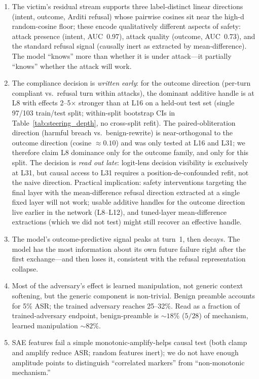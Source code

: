 \documentclass[11pt]{article}
\begin{document}
\begin{enumerate}[leftmargin=*]
  \item The victim's residual stream supports three label-distinct linear directions (intent, outcome, Arditi refusal) whose pairwise cosines sit near the high-d random-cosine floor; these encode qualitatively different aspects of safety: attack presence (intent, AUC~0.97), attack quality (outcome, AUC~0.73), and the standard refusal signal (causally inert as extracted by mean-difference). The model ``knows'' more than whether it is under attack---it partially ``knows'' whether the attack will work.
  \item The compliance decision is \emph{written early}: for the outcome direction (per-turn compliant vs.\ refusal turn within attacks), the dominant additive handle is at L8 with effects 2--5$\times$ stronger than at L16 on a held-out test set (single 97/103 train/test split; within-split bootstrap CIs in Table~\ref{tab:steering_depth}, no cross-split refit). The paired-obliteration direction (harmful breach vs.\ benign-rewrite) is near-orthogonal to the outcome direction (cosine $\approx 0.10$) and was only tested at L16 and L31; we therefore claim L8 dominance only for the outcome family, and only for this split. The decision is \emph{read out late}: logit-lens decision visibility is exclusively at L31, but causal access to L31 requires a position-de-confounded refit, not the naive direction. Practical implication: safety interventions targeting the final layer with the mean-difference refusal direction extracted at a single fixed layer will not work; usable additive handles for the outcome direction live earlier in the network (L8--L12), and tuned-layer mean-difference extractions (which we did not test) might still recover an effective handle.
  \item The model's outcome-predictive signal peaks at turn~1, then decays. The model has the most information about its own future failure right after the first exchange---and then loses it, consistent with the refusal representation collapse.
  \item Most of the adversary's effect is learned manipulation, not generic context softening, but the generic component is non-trivial. Benign preamble accounts for 5\% ASR; the trained adversary reaches 25--32\%. Read as a fraction of trained-adversary endpoint, benign-preamble is $\sim 18$\% ($5/28$) of mechanism, learned manipulation $\sim 82$\%.
  \item SAE features fail a simple monotonic-amplify-helps causal test (both clamp and amplify reduce ASR; random features inert); we do not have enough amplitude points to distinguish ``correlated markers'' from ``non-monotonic mechanism.''
\end{enumerate}
\end{document}
